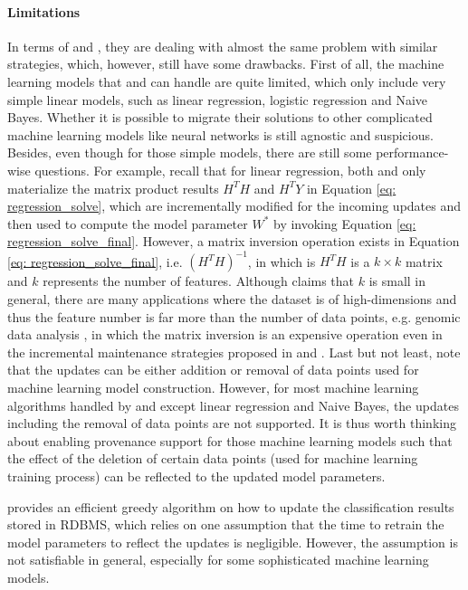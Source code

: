\paragraph{Limitations} In terms of \cite{deshpande2006mauvedb} and \cite{gupta2015processing}, they are dealing with almost the same problem with similar strategies, which, however, still have some drawbacks. First of all, the machine learning models that \cite{deshpande2006mauvedb} and \cite{gupta2015processing} can handle are quite limited, which only include very simple linear models, such as linear regression, logistic regression and Naive Bayes. Whether it is possible to migrate their solutions to other complicated machine learning models like neural networks is still agnostic and suspicious. Besides, even though for those simple models, there are still some performance-wise questions. For example, recall that for linear regression, both \cite{deshpande2006mauvedb} and \cite{gupta2015processing} only materialize the matrix product results $H^TH$ and $H^TY$ in Equation \ref{eq: regression_solve}, which are incrementally modified for the incoming updates and then used to compute the model parameter $W^*$ by invoking Equation \ref{eq: regression_solve_final}. However, a matrix inversion operation exists in Equation \ref{eq: regression_solve_final}, i.e. $(H^TH)^{-1}$, in which is $H^TH$ is a $k\times k$ matrix and $k$ represents the number of features. Although \cite{deshpande2006mauvedb} claims that $k$ is small in general, there are many applications where the dataset is of high-dimensions and thus the feature number is far more than the number of data points, e.g. genomic data analysis \cite{buhlmann2011statistics}, in which the matrix inversion is an expensive operation even in the incremental maintenance strategies proposed in \cite{deshpande2006mauvedb} and \cite{gupta2015processing}. Last but not least, note that the updates can be either addition or removal of data points used for machine learning model construction. However, for most machine learning algorithms handled by \cite{deshpande2006mauvedb} and \cite{gupta2015processing} except linear regression and Naive Bayes, the updates including the removal of data points are not supported. It is thus worth thinking about enabling provenance support \cite{cheney2009provenance} for those machine learning models such that the effect of the deletion of certain data points (used for machine learning training process) can be reflected to the updated model parameters.

\cite{koc2011incrementally} provides an efficient greedy algorithm on how to update the classification results stored in RDBMS, which relies on one assumption that the time to retrain the model parameters to reflect the updates is negligible. However, the assumption is not satisfiable in general, especially for some sophisticated machine learning models. 


